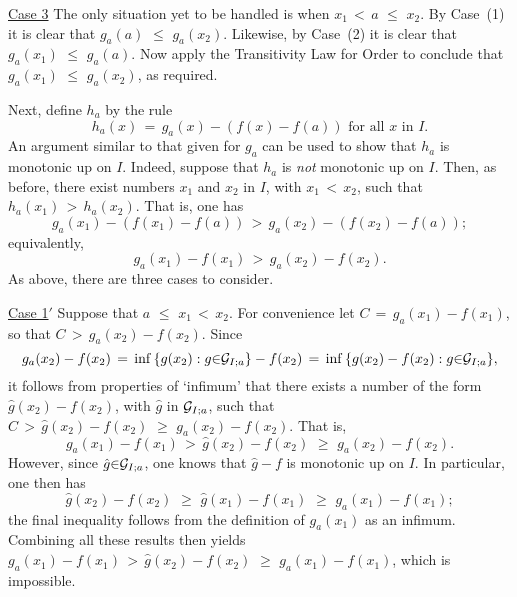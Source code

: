         \underline{Case 3} The only situation yet to be handled is when $x_{1}\,<\,a\,\,{\leq}\,\,x_{2}$.
    By Case~(1) it is clear that $g_{a}(a)\,\,{\leq}\,\,g_{a}(x_{2})$. Likewise, by Case~(2) it is clear that $g_{a}(x_{1})\,\,{\leq}\,\,g_{a}(a)$.
    Now apply the Transitivity Law for Order to conclude that $g_{a}(x_{1})\,\,{\leq}\,\,g_{a}(x_{2})$, as required.

    Next, define $h_{a}$ by the rule
        \begin{displaymath}
        h_{a}(x) \,=\, g_{a}(x)-(f(x)-f(a)) \mbox{ for all $x$ in $I$}.
        \end{displaymath}
    An argument similar to that given for $g_{a}$ can be used to show that $h_{a}$ is monotonic up on $I$.
    Indeed, suppose that $h_{a}$ is {\em not} monotonic up on $I$.
    Then, as before, there exist numbers $x_{1}$ and $x_{2}$ in $I$, with $x_{1}\,<\,x_{2}$, such that $h_{a}(x_{1})\,>\,h_{a}(x_{2})$.
    That is, one has
        \begin{displaymath}
        g_{a}(x_{1})-(f(x_{1})-f(a))\,>\,g_{a}(x_{2})-(f(x_{2})-f(a));
        \end{displaymath}
    equivalently,
        \begin{displaymath}
        g_{a}(x_{1})-f(x_{1})\,>\,g_{a}(x_{2})-f(x_{2}).
        \end{displaymath}
    As above, there are three cases to consider.

        \underline{Case 1$'$} Suppose that $a\,\,{\leq}\,\,x_{1}\,<\,x_{2}$.
    For convenience let $C \,=\, g_{a}(x_{1})-f(x_{1})$, so that $C\,>\,g_{a}(x_{2})-f(x_{2})$.
    Since
        \begin{displaymath}
        g_{a}(x_{2})-f(x_{2}) \,=\, {\inf}\,\{g(x_{2}): g{\in}{\cal G}_{I;a}\} - f(x_{2}) \,=\, {\inf}\,\{g(x_{2})-f(x_{2}): g{\in}{\cal G}_{I;a}\},
        \end{displaymath}
    it follows from properties of `infimum' that there exists a number of the form $\hat{g}(x_{2})-f(x_{2})$, with $\hat{g}$ in ${\cal G}_{I;a}$,
    such that $C\,>\,\hat{g}(x_{2})-f(x_{2})\,\,{\geq}\,\,g_{a}(x_{2})-f(x_{2})$.
    That is,
        \begin{displaymath}
        g_{a}(x_{1})-f(x_{1})\,>\,\hat{g}(x_{2})-f(x_{2})\,\,{\geq}\,\,g_{a}(x_{2})-f(x_{2}).
        \end{displaymath}
    However, since $\hat{g}{\in}{\cal G}_{I;a}$, one knows that $\hat{g}-f$ is monotonic up on $I$.
    In particular, one then has
        \begin{displaymath}
        \hat{g}(x_{2})-f(x_{2})\,\,{\geq}\,\,\hat{g}(x_{1})-f(x_{1})\,\,{\geq}\,\,g_{a}(x_{1})-f(x_{1});
        \end{displaymath}
    the final inequality follows from the definition of $g_{a}(x_{1})$ as an infimum.
    Combining all these results then yields
       $ g_{a}(x_{1})-f(x_{1})\,>\,\hat{g}(x_{2})-f(x_{2})\,\,{\geq}\,\,g_{a}(x_{1})-f(x_{1})$,
    which is impossible.


